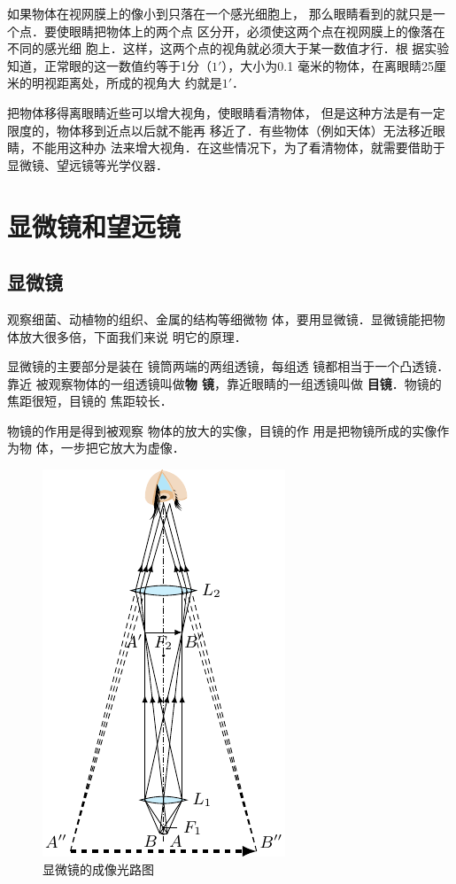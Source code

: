 如果物体在视网膜上的像小到只落在一个感光细胞上，
那么眼睛看到的就只是一个点．要使眼睛把物体上的两个点
区分开，必须使这两个点在视网膜上的像落在不同的感光细
胞上．这样，这两个点的视角就必须大于某一数值才行．根
据实验知道，正常眼的这一数值约等于1分（$1'$），大小为0.1
毫米的物体，在离眼睛25厘米的明视距离处，所成的视角大
约就是$1'$．

把物体移得离眼睛近些可以增大视角，使眼睛看清物体，
但是这种方法是有一定限度的，物体移到近点以后就不能再
移近了．有些物体（例如天体）无法移近眼睛，不能用这种办
法来增大视角．在这些情况下，为了看清物体，就需要借助于
显微镜、望远镜等光学仪器．

\section{显微镜和望远镜}
\subsection{显微镜}

观察细菌、动植物的组织、金属的结构等细微物
体，要用显微镜．显微镜能把物体放大很多倍，下面我们来说
明它的原理．

显微镜的主要部分是装在
镜筒两端的两组透镜，每组透
镜都相当于一个凸透镜．靠近
被观察物体的一组透镜叫做\textbf{物
镜}，靠近眼睛的一组透镜叫做
\textbf{目镜}．物镜的焦距很短，目镜的
焦距较长．

物镜的作用是得到被观察
物体的放大的实像，目镜的作
用是把物镜所成的实像作为物
体，一步把它放大为虚像．

\begin{figure}[htbp]
    \centering
    \includegraphics{fig/C/5-53.pdf}
    \caption{显微镜的成像光路图}\label{fig_C_5-53}
\end{figure}

